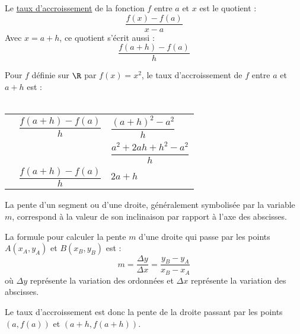\documentclass[12pt]{article}
\begin{document}
\begin{definition}
   Le \underline{taux d'accroissement} de la fonction $f$ entre $a$ et $x$ est le quotient :
$$\dfrac{f(x)-f(a)}{x-a}$$
Avec $x=a+h$, ce quotient s'écrit aussi : $$\dfrac{f(a+h)-f(a)}{h}$$
\end{definition}

\begin{exemple}
   Pour $f$ définie sur $\R$ par $f(x)=x^2$, le taux d'accroissement
   de $f$ entre $a$ et $a+h$ est : \\ \\
   \begin{tabular}{p{0.3cm}l!{=}l}
      &  $\dfrac{f(a+h)-f(a)}{h}$ & $\dfrac{(a+h)^2-a^2}{h}$ \\
      & & $\dfrac{a^2+2ah+h^2-a^2}{h}$ \\
      &   $\dfrac{f(a+h)-f(a)}{h}$ & $2a+h$ \\
   \end{tabular}
\end{exemple}

\begin{definition}[Rappel]
La pente d’un segment ou d'une droite, généralement symbolisée par la variable $m$, correspond à la valeur de son inclinaison par rapport à l'axe des abscisses.
\end{definition}

\begin{rappel}
La formule pour calculer la pente $m$ d’une droite qui passe par les
points $A(x_A, y_A)$ et $B(x_B, y_B)$ est : $$m=\dfrac{\Delta
y}{\Delta x} = \dfrac{y_B-y_A}{x_B-x_A}$$
où $\Delta y$ représente la variation des ordonnées et $\Delta x$ représente la variation des abscisses.
\end{rappel}

\begin{remarque}
  Le taux d'accroissement est donc la pente de la droite passant par les points
  $\left(a, f(a)\right)$ et $\left(a+h, f(a+h)\right)$.
\begin{center}
  \end{center}
\end{remarque}
\end{document}

